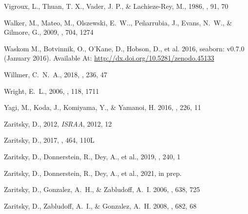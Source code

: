 \documentclass[twocolumn,tighten]{aastex63}
\begin{document}
\begin{thebibliography}{}
Vigroux, L., Thuan, T. X., Vader, J. P., \& Lachieze-Rey, M., 1986, \aj, 91, 70

Walker, M., Mateo, M., Olszewski, E.~W.., Pe\~narrubia, J., Evans, N.~W., \& Gilmore, G., 2009, \apj, 704, 1274

Waskom M., Botvinnik, O., O'Kane, D., Hobson, D., et al. 2016, seaborn: v0.7.0 (January 2016). Available At: \url{http://dx.doi.org/10.5281/zenodo.45133}

Willmer, C.~N.~A., 2018, \apjs, 236, 47


{Wright}, E.~L., 2006, \pasp, 118, 1711

Yagi, M., Koda, J., Komiyama, Y., \& Yamanoi, H. 2016, \apjs, 226, 11

Zaritsky, D., 2012, {\sl ISRAA}, 2012, 12

Zaritsky, D., 2017, \mnras, 464, 110L

Zaritsky, D., Donnerstein, R., Dey, A., et al., 2019, \apjs, 240, 1

Zaritsky, D., Donnerstein, R., Dey, A., et al., 2021, in prep.

Zaritsky, D., Gonzalez, A.~H., \& Zabludoff, A.~I. 2006, \apj, 638, 725

Zaritsky, D., Zabludoff, A.~I., \& Gonzalez, A.~H. 2008, \apj, 682, 68

\end{thebibliography}

\clearpage
\end{document}
